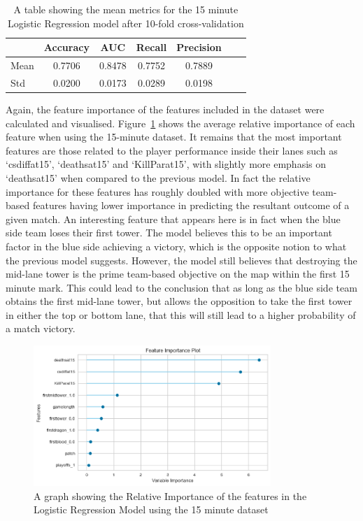 \begin{table}[h]
    \centering
    \begin{tabular}{lcccccc}
        \toprule
        \textbf{} & \textbf{Accuracy} & \textbf{AUC} & \textbf{Recall} & \textbf{Precision} \\
        \midrule
        Mean & 0.7706 & 0.8478 & 0.7752 & 0.7889 \\
        Std & 0.0200 & 0.0173 & 0.0289 & 0.0198 \\
        \bottomrule
    \end{tabular}
    \caption{A table showing the mean metrics for the 15 minute Logistic Regression model after 10-fold cross-validation}
    \label{tab:Kfold15}
\end{table}

Again, the feature importance of the features included in the dataset were calculated and visualised.
Figure~\ref{fig:FeatureImport15} shows the average relative importance of each feature when using the 15-minute dataset.
It remains that the most important features are those related to the player performance inside their lanes such as `csdiffat15', `deathsat15' and `KillParat15', with slightly more emphasis on `deathsat15' when compared to the previous model.
In fact the relative importance for these features has roughly doubled
with more objective team-based features having lower importance in predicting the resultant outcome of a given match.
An interesting feature that appears here is in fact when the blue side team loses their first tower.
The model believes this to be an important factor in the blue side achieving a victory, which is the opposite notion to what the previous model suggests.
However, the model still believes that destroying the mid-lane tower is the prime team-based objective on the map within the first 15 minute mark.
This could lead to the conclusion that as long as the blue side team obtains the first mid-lane tower, but allows the opposition to take the first tower in either the top or bottom lane, that this will still lead to a higher probability of a match victory. \\


\begin{figure}[h]
    \centering
    \includegraphics[width=0.8\textwidth]{figures/FeatureImport15}
    \caption{A graph showing the Relative Importance of the features in the Logistic Regression Model using the 15 minute dataset}
    \label{fig:FeatureImport15}
\end{figure}

